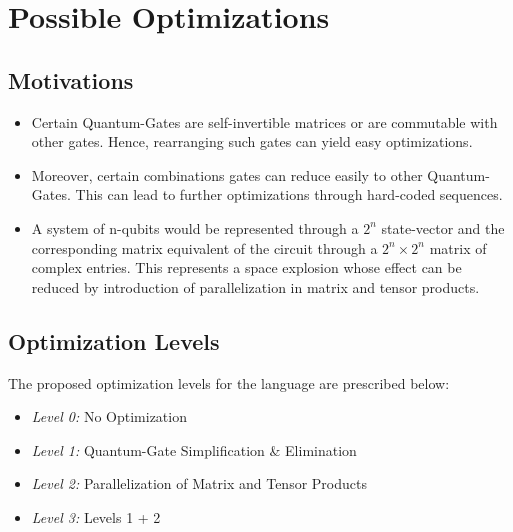\chapter{Possible Optimizations}\label{ch:Optimizations}

\section{Motivations}
\begin{itemize}
    \item Certain Quantum-Gates are self-invertible matrices or are commutable with other gates. Hence, rearranging such gates can yield easy optimizations.
    \item Moreover, certain combinations gates can reduce easily to other Quantum-Gates. This can lead to further optimizations through hard-coded sequences.
    \item A system of n-qubits would be represented through a $2^n$ state-vector and the corresponding matrix equivalent of the circuit through a $2^n \times 2^n$ 
    matrix of complex entries. This represents a space explosion whose effect can be reduced by introduction of parallelization in matrix and tensor products.
\end{itemize}

\section{Optimization Levels}
The proposed optimization levels for the language are prescribed below:
\begin{itemize}
    \item \emph{Level 0:} No Optimization
    \item \emph{Level 1:} Quantum-Gate Simplification \& Elimination
    \item \emph{Level 2:} Parallelization of Matrix and Tensor Products
    \item \emph{Level 3:} Levels 1 + 2
\end{itemize}